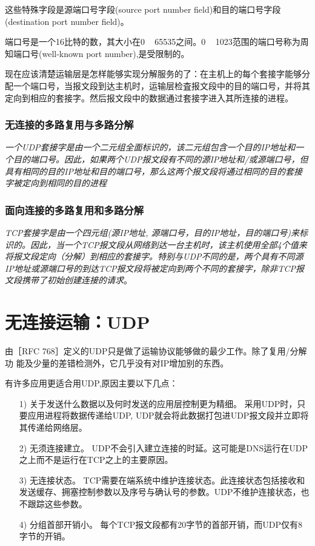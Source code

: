     这些特殊字段是源端口号字段(source port number field)和目的端口号字段(destination port number field)。

    端口号是一个16比特的数，其大小在0 ~ 65535之间。0 ~ 1023范围的端口号称为周知端口号(well-known port number),是受限制的。

    现在应该清楚运输层是怎样能够实现分解服务的了：在主机上的每个套接字能够分配一个端口号，当报文段到达主机时，运输层检査报文段中的目的端口号，并将其定向到相应的套接字。然后报文段中的数据通过套接字进入其所连接的进程。

\subsubsection{无连接的多路复用与多路分解}

    \emph{一个UDP套接字是由一个二元组全面标识的，该二元组包含一个目的IP地址和一个目的端口号。因此，如果两个UDP报文段有不同的源IP地址和/或源端口号，但具有相同的目的IP地址和目的端口号，那么这两个报文段将通过相同的目的套接字被定向到相同的目的进程}

\subsubsection{面向连接的多路复用和多路分解}

    \emph{TCP套接字是由一个四元组(源IP地址, 源端口号，目的IP地址，目的端口号)来标识的。因此，当一个TCP报文段从网络到达一台主机时，该主机使用全部4个值来将报文段定向（分解）到相应的套接字。特别与UDP不同的是，两个具有不同源IP地址或源端口号的到达TCP报文段将被定向到两个不同的套接字，除非TCP报文段携带了初始创建连接的请求}。

\section{无连接运输：UDP}

    由［RFC 768］定义的UDP只是做了运输协议能够做的最少工作。除了复用/分解功 能及少量的差错检测外，它几乎没有对IP增加别的东西。

    有许多应用更适合用UDP,原因主要以下几点：

\begin{itemize}
    \item [1)] 关于发送什么数据以及何时发送的应用层控制更为精细。
    \subitem 采用UDP时，只要应用进程将数据传递给UDP, UDP就会将此数据打包进UDP报文段并立即将其传递给网络层。
    \item [2)] 无须连接建立。
    \subitem UDP不会引入建立连接的时延。这可能是DNS运行在UDP之上而不是运行在TCP之上的主要原因。
    \item [3)] 无连接状态。
    \subitem TCP需要在端系统中维护连接状态。此连接状态包括接收和发送缓存、拥塞控制参数以及序号与确认号的参数。UDP不维护连接状态，也不跟踪这些参数。
    \item [4)] 分组首部开销小。
    \subitem 每个TCP报文段都有20字节的首部开销，而UDP仅有8字节的开销。
\end{itemize}

